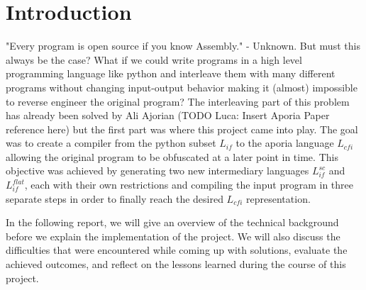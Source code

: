 \section{Introduction}

"Every program is open source if you know Assembly." - Unknown. But must this always be the case? What if we could write programs in a high level programming language like python and
interleave them with many different programs without changing input-output behavior making it (almost) impossible to reverse engineer the original program? The interleaving part of this problem has already been 
solved by Ali Ajorian (TODO Luca: Insert Aporia Paper reference here) but the first part was where this project came into play.
The goal was to create a compiler from the python subset $L_{if}$ to the aporia language $L_{cfi}$ allowing the original program to be obfuscated at a later point in time.
This objective was achieved by generating two new intermediary languages $L_{if}^{sc}$ and $L_{if}^{flat}$, each with their own restrictions and compiling the input program 
in three separate steps in order to finally reach the desired $L_{cfi}$ representation.


In the following report, we will give an overview of the technical background before we explain the implementation of the project. We will also discuss the difficulties that were 
encountered while coming up with solutions, evaluate the achieved outcomes, and reflect on the lessons learned during the course of this project.
